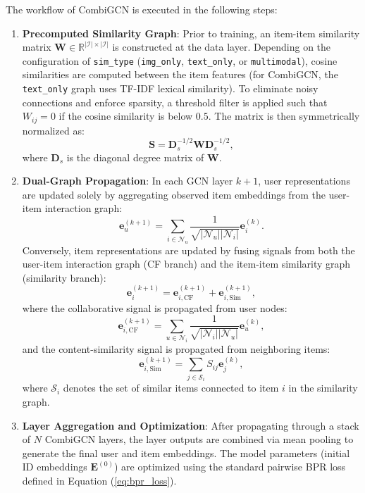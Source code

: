 The workflow of CombiGCN is executed in the following steps:
\begin{enumerate}
    \item \textbf{Precomputed Similarity Graph}: Prior to training, an item-item similarity matrix $\mathbf{W} \in \mathbb{R}^{|\mathcal{I}| \times |\mathcal{I}|}$ is constructed at the data layer. Depending on the configuration of \texttt{sim\_type} (\texttt{img\_only}, \texttt{text\_only}, or \texttt{multimodal}), cosine similarities are computed between the item features (for CombiGCN, the \texttt{text\_only} graph uses TF-IDF lexical similarity). To eliminate noisy connections and enforce sparsity, a threshold filter is applied such that $W_{ij} = 0$ if the cosine similarity is below $0.5$. The matrix is then symmetrically normalized as:
    \begin{equation}
        \mathbf{S} = \mathbf{D}_s^{-1/2} \mathbf{W} \mathbf{D}_s^{-1/2},
    \end{equation}
    where $\mathbf{D}_s$ is the diagonal degree matrix of $\mathbf{W}$.
    \item \textbf{Dual-Graph Propagation}: In each GCN layer $k+1$, user representations are updated solely by aggregating observed item embeddings from the user-item interaction graph:
    \begin{equation}
        \mathbf{e}_u^{(k+1)} = \sum_{i \in \mathcal{N}_u} \frac{1}{\sqrt{|\mathcal{N}_u| |\mathcal{N}_i|}} \mathbf{e}_i^{(k)}.
    \end{equation}
    Conversely, item representations are updated by fusing signals from both the user-item interaction graph (CF branch) and the item-item similarity graph (similarity branch):
    \begin{equation}
        \mathbf{e}_i^{(k+1)} = \mathbf{e}_{i, \text{CF}}^{(k+1)} + \mathbf{e}_{i, \text{Sim}}^{(k+1)},
    \end{equation}
    where the collaborative signal is propagated from user nodes:
    \begin{equation}
        \mathbf{e}_{i, \text{CF}}^{(k+1)} = \sum_{u \in \mathcal{N}_i} \frac{1}{\sqrt{|\mathcal{N}_i| |\mathcal{N}_u|}} \mathbf{e}_u^{(k)},
    \end{equation}
    and the content-similarity signal is propagated from neighboring items:
    \begin{equation}
        \mathbf{e}_{i, \text{Sim}}^{(k+1)} = \sum_{j \in \mathcal{S}_i} S_{ij} \mathbf{e}_j^{(k)},
    \end{equation}
    where $\mathcal{S}_i$ denotes the set of similar items connected to item $i$ in the similarity graph.
    \item \textbf{Layer Aggregation and Optimization}: After propagating through a stack of $N$ CombiGCN layers, the layer outputs are combined via mean pooling to generate the final user and item embeddings. The model parameters (initial ID embeddings $\mathbf{E}^{(0)}$) are optimized using the standard pairwise BPR loss defined in Equation (\ref{eq:bpr_loss}).
\end{enumerate}

